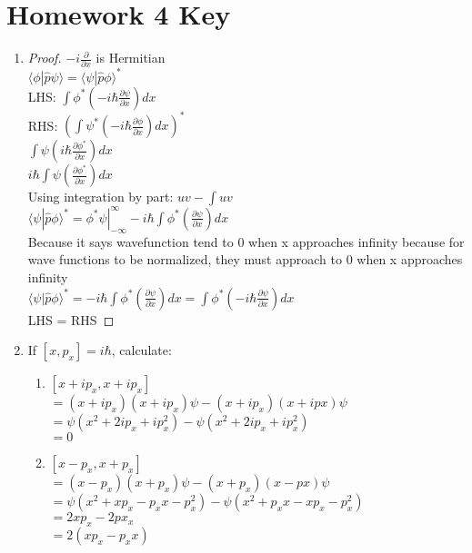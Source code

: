 \documentclass{article}
\begin{document}
\section*{Homework 4 Key}
 
\begin{enumerate}%

\item \begin{proof} $-i\frac{\partial}{\partial x}$ is Hermitian
\\ $\langle \phi|\hat{p} \psi\rangle = \langle \psi|\hat{p} \phi\rangle^*$
\\ LHS: $\int \phi^*(-i\hbar\frac{\partial \psi}{\partial x})dx$
\\ RHS: $\left(\int \psi^*(-i\hbar\frac{\partial \phi}{\partial x})dx\right)^*$
\\ $\int \psi(i\hbar\frac{\partial \phi^*}{\partial x})dx$
\\ $i\hbar\int \psi(\frac{\partial \phi^*}{\partial x})dx$
\\ Using integration by part: $uv-\int uv$
\\ $\langle \psi|\hat{p} \phi\rangle^*=\phi^*\psi|_{-\infty}^{\infty}-i\hbar\int\phi^*(\frac{\partial \psi}{\partial x})dx$
\\Because it says wavefunction tend to 0 when x approaches infinity because for wave functions to be normalized, they must approach to 0 when x approaches infinity
\\ $\langle \psi|\hat{p} \phi\rangle^*=-i\hbar\int\phi^*(\frac{\partial \psi}{\partial x})dx = \int \phi^*(-i\hbar\frac{\partial \psi}{\partial x})dx$
\\ \therefore LHS = RHS
\end{proof}
\item If $[x,p_x]=i\hbar$, calculate:
    \begin{enumerate}
    \item $[x+ip_x,x+ip_x]$
    \\ $=(x+ip_x)(x+ip_x)\psi-(x+ip_x)(x+ipx)\psi$
    \\ $=\psi(x^2+2ip_x+ip_x^2)-\psi(x^2+2ip_x+ip_x^2)$
    \\ $=0$
    \item $[x-p_x,x+p_x]$
    \\ $=(x-p_x)(x+p_x)\psi-(x+p_x)(x-px)\psi$
    \\ $=\psi(x^2+xp_x-p_xx-p_x^2)-\psi(x^2+p_xx-xp_x-p_x^2)$
    \\ $=2xp_x-2px_x$
    \\ $=2(xp_x-p_xx)$

\end{enumerate}
\end{enumerate}
\end{document}
